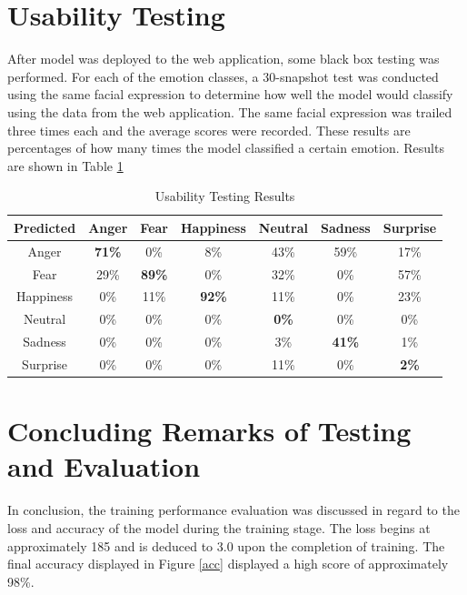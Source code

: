\section{Usability Testing}
After model was deployed to the web application, some black box testing was performed. For each of the emotion classes, a 30-snapshot test was conducted using the same facial expression to determine how well the model would classify using the data from the web application. The same facial expression was trailed three times each and the average scores were recorded. These results are percentages of how many times the model classified a certain emotion. Results are shown in Table \ref{table:use}


\begin{table}[ht]
	\begin{center}
		\begin{tabular}{|c|c|c|c|c|c|c|}		
			\hline 
			Predicted & \textbf{Anger} &  \textbf{Fear} & \textbf{Happiness} & \textbf{Neutral} & \textbf{Sadness}& \textbf{Surprise}\\
			\hline 
			Anger & \textbf{71\%} &0\% &8\% & 43\%& 59\% & 17\%\\
			\hline 
			Fear & 29\% & \textbf{89\%} & 0\%& 32\%&0\% & 57\%\\
			\hline 
			Happiness &0\% &11\% &\textbf{92\%} & 11\%&0\% &23\% \\
			\hline 
			Neutral & 0\% &0\% &0\% & \textbf{0\%}&0\% &0\% \\
			\hline 
			Sadness & 0\%&0\% &0\% & 3\%& \textbf{41\% }&1\% \\
			\hline 
			Surprise & 0\%&0\% &0\% & 11\%&0\% & \textbf{2\%}\\
			\hline
		\end{tabular}
		\caption{Usability Testing Results}
		\label{table:use}
	\end{center}
\end{table}
\newpage


\section{Concluding Remarks of Testing and Evaluation}
In conclusion, the training performance evaluation was discussed in regard to the loss and accuracy of the model during the training stage.
The loss begins at approximately 185 and is deduced to 3.0 upon the completion of training. The final accuracy displayed in Figure \ref{acc} displayed a high score of approximately 98\%.

